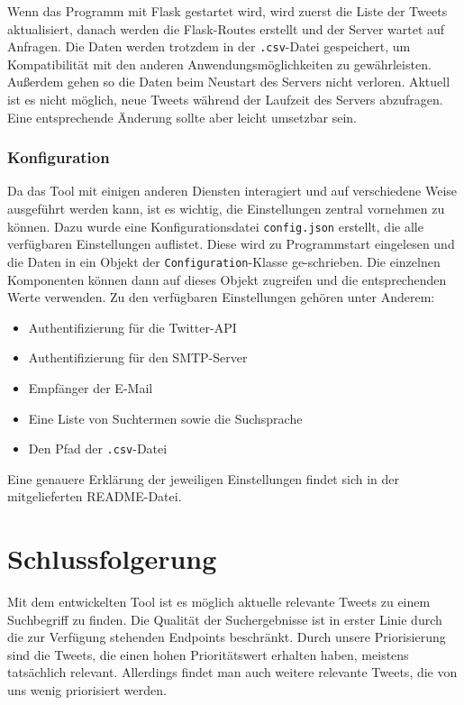 \documentclass[runningheads]{llncs}
\begin{document}
Wenn das Programm mit Flask gestartet wird, wird zuerst die Liste der Tweets aktualisiert, danach werden die Flask-Routes erstellt und der Server wartet auf Anfragen.
Die Daten werden trotzdem in der \texttt{.csv}-Datei gespeichert, um Kompatibilität mit den anderen Anwendungsmöglichkeiten zu gewährleisten.
Außerdem gehen so die Daten beim Neustart des Servers nicht verloren.
Aktuell ist es nicht möglich, neue Tweets während der Laufzeit des Servers abzufragen.
Eine entsprechende Änderung sollte aber leicht umsetzbar sein.

\subsubsection{Konfiguration}
Da das Tool mit einigen anderen Diensten interagiert und auf verschiedene Weise ausgeführt werden kann, ist es wichtig, die Einstellungen zentral vornehmen zu können.
Dazu wurde eine Konfigurationsdatei \texttt{config.json} erstellt, die alle verfügbaren Einstellungen auflistet.
Diese wird zu Programmstart eingelesen und die Daten in ein Objekt der \texttt{Configuration}-Klasse ge-schrieben.
Die einzelnen Komponenten können dann auf dieses Objekt zugreifen und die entsprechenden Werte verwenden.
Zu den verfügbaren Einstellungen gehören unter Anderem:
\begin{itemize} 
    \item Authentifizierung für die Twitter-API
    \item Authentifizierung für den SMTP-Server
    \item Empfänger der E-Mail
    \item Eine Liste von Suchtermen sowie die Suchsprache
    \item Den Pfad der \texttt{.csv}-Datei
\end{itemize} 
Eine genauere Erklärung der jeweiligen Einstellungen findet sich in der mitgelieferten README-Datei.

\section{Schlussfolgerung}
Mit dem entwickelten Tool ist es möglich aktuelle relevante Tweets zu einem Suchbegriff zu finden.
Die Qualität der Suchergebnisse ist in erster Linie durch die zur Verfügung stehenden Endpoints beschränkt.
Durch unsere Priorisierung sind die Tweets, die einen hohen Prioritätswert erhalten haben, meistens tatsächlich relevant.
Allerdings findet man auch weitere relevante Tweets, die von uns wenig priorisiert werden.
\end{document}

